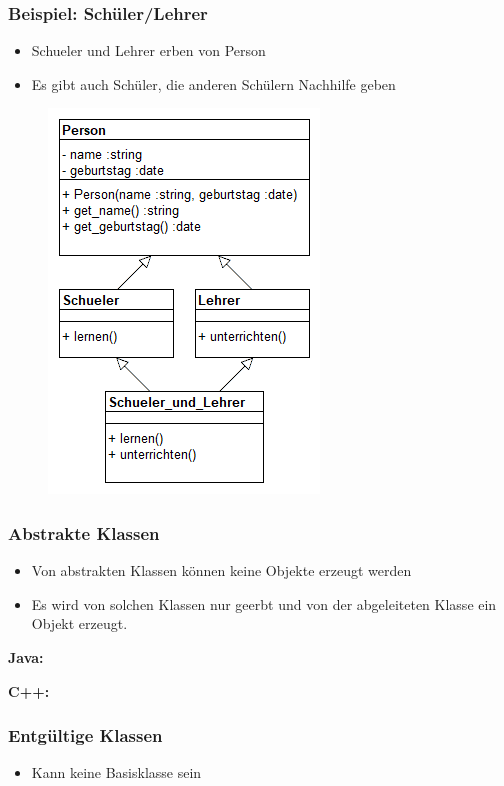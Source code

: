 \begin{frame}
	\frametitle{Beispiel: Schüler/Lehrer}
	\begin{itemize}
		\item Schueler und Lehrer erben von Person
		\item Es gibt auch Schüler, die anderen Schülern Nachhilfe geben
	\end{itemize}
	\begin{figure}[H]
		\includegraphics[scale=0.5]{vererbung/mehrfach/diamond/beispiele/schueler_lehrer/schueler_lehrer.png}
	\end{figure}
\end{frame}


\begin{frame}
	\frametitle{Abstrakte Klassen}
	\begin{itemize}
		\item Von abstrakten Klassen können keine Objekte erzeugt werden
		\item Es wird von solchen Klassen nur geerbt und von der abgeleiteten Klasse ein Objekt erzeugt.
	\end{itemize}
	\pause
	{\tiny\bfseries Java:}
		{\tiny\UseRawInputEncoding{}}
	
	{\tiny\bfseries C++:}
		{\tiny\UseRawInputEncoding{}}
		
		
\end{frame}


\begin{frame}
	\frametitle{Entgültige Klassen}
	\begin{itemize}
		\item Kann keine Basisklasse sein
	\end{itemize}
\end{frame}
